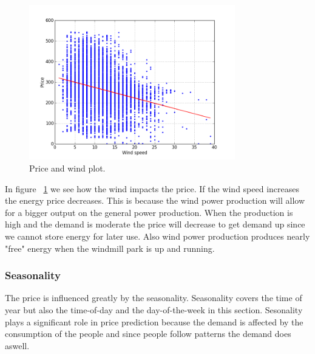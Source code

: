 \begin{figure}[H]
\centering
\includegraphics[width=0.8\textwidth ,natwidth=410,natheight=237]{billeder/energy_price_plots/price_wind.png}
\caption{Price and wind plot.}
\label{fig:price_wind}
\end{figure}

In figure ~\ref{fig:price_wind} we see how the wind impacts the price. If the wind speed increases the energy price decreases. This is because the wind power production will allow for a bigger output on the general power production. When the production is high and the demand is moderate the price will decrease to get demand up since we cannot store energy for later use. Also wind power production produces nearly "free" energy when the windmill park is up and running.

\subsubsection{Seasonality}
The price is influenced greatly by the seasonality. Seasonality covers the time of year but also the time-of-day and the day-of-the-week in this section. Sesonality plays a significant role in price prediction because the demand is affected by the consumption of the people and since people follow patterns the demand does aswell.


